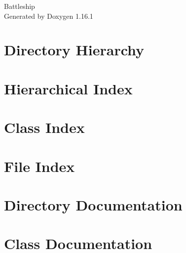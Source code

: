 \documentclass[twoside]{book}
\newcommand{\+}{\discretionary{\mbox{\scriptsize$\hookleftarrow$}}{}{}}
\newcommand{\clearemptydoublepage}{%
    \newpage{\pagestyle{empty}\cleardoublepage}%
  }
\begin{document}
  \raggedbottom
    \hypersetup{pageanchor=false,
                bookmarksnumbered=true,
                pdfencoding=unicode
               }
  \begin{titlepage}
  \vspace*{7cm}
  \begin{center}%
  {\Large Battleship}\\
  \vspace*{1cm}
  {\large Generated by Doxygen 1.16.1}\\
  \end{center}
  \end{titlepage}
  \clearemptydoublepage
  \tableofcontents
  \clearemptydoublepage
  \hypersetup{pageanchor=true}

\chapter{Directory Hierarchy}

\chapter{Hierarchical Index}

\chapter{Class Index}

\chapter{File Index}

\chapter{Directory Documentation}



\chapter{Class Documentation}







\end{document}
